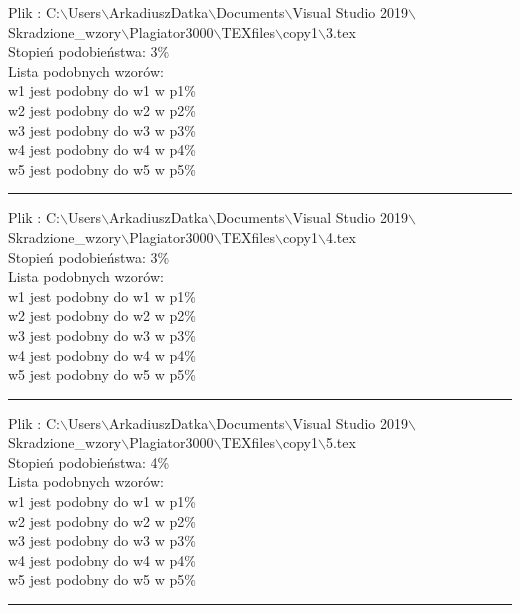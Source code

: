 \documentclass{article}
\begin{document}
\begin{flushleft}
Plik : C:$\backslash$Users$\backslash$ArkadiuszDatka$\backslash$Documents$\backslash$Visual Studio 2019$\backslash$Skradzione\_wzory$\backslash$Plagiator3000$\backslash$TEXfiles$\backslash$copy1$\backslash$3.tex\\
{\huge Stopień podobieństwa: 3\%} \\ 
Lista podobnych wzorów: \\ 
{\tiny w1 jest podobny do w1 w p1\% } \\ 
{\tiny w2 jest podobny do w2 w p2\% } \\ 
{\tiny w3 jest podobny do w3 w p3\% } \\ 
{\tiny w4 jest podobny do w4 w p4\% } \\ 
{\tiny w5 jest podobny do w5 w p5\% } \\ 

\end{flushleft}
\hrule
\begin{flushleft}
Plik : C:$\backslash$Users$\backslash$ArkadiuszDatka$\backslash$Documents$\backslash$Visual Studio 2019$\backslash$Skradzione\_wzory$\backslash$Plagiator3000$\backslash$TEXfiles$\backslash$copy1$\backslash$4.tex\\
{\huge Stopień podobieństwa: 3\%} \\ 
Lista podobnych wzorów: \\ 
{\tiny w1 jest podobny do w1 w p1\% } \\ 
{\tiny w2 jest podobny do w2 w p2\% } \\ 
{\tiny w3 jest podobny do w3 w p3\% } \\ 
{\tiny w4 jest podobny do w4 w p4\% } \\ 
{\tiny w5 jest podobny do w5 w p5\% } \\ 

\end{flushleft}
\hrule
\begin{flushleft}
Plik : C:$\backslash$Users$\backslash$ArkadiuszDatka$\backslash$Documents$\backslash$Visual Studio 2019$\backslash$Skradzione\_wzory$\backslash$Plagiator3000$\backslash$TEXfiles$\backslash$copy1$\backslash$5.tex\\
{\huge Stopień podobieństwa: 4\%} \\ 
Lista podobnych wzorów: \\ 
{\tiny w1 jest podobny do w1 w p1\% } \\ 
{\tiny w2 jest podobny do w2 w p2\% } \\ 
{\tiny w3 jest podobny do w3 w p3\% } \\ 
{\tiny w4 jest podobny do w4 w p4\% } \\ 
{\tiny w5 jest podobny do w5 w p5\% } \\ 

\end{flushleft}
\hrule
\end{document}
